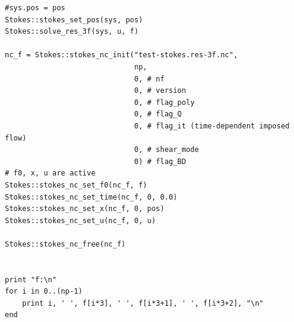 \documentclass{book}
\begin{document}
{\begin{verbatim}
#sys.pos = pos
Stokes::stokes_set_pos(sys, pos)
Stokes::solve_res_3f(sys, u, f)

nc_f = Stokes::stokes_nc_init("test-stokes.res-3f.nc",
                              np,
                              0, # nf
                              0, # version
                              0, # flag_poly
                              0, # flag_Q
                              0, # flag_it (time-dependent imposed flow)
                              0, # shear_mode
                              0) # flag_BD
# f0, x, u are active
Stokes::stokes_nc_set_f0(nc_f, f)
Stokes::stokes_nc_set_time(nc_f, 0, 0.0)
Stokes::stokes_nc_set_x(nc_f, 0, pos)
Stokes::stokes_nc_set_u(nc_f, 0, u)

Stokes::stokes_nc_free(nc_f)


print "f:\n"
for i in 0..(np-1)
    print i, ' ', f[i*3], ' ', f[i*3+1], ' ', f[i*3+2], "\n"
end
\end{verbatim}
}
\end{document}
